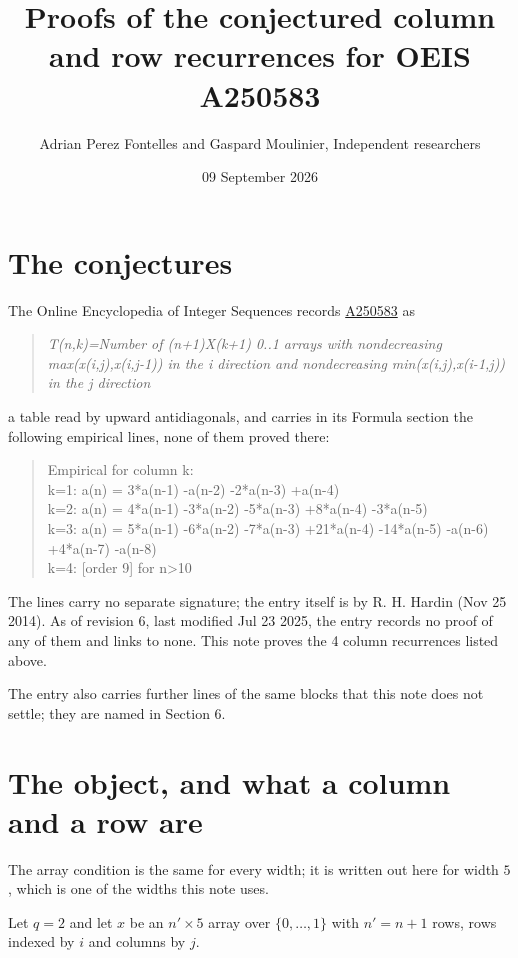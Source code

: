 \documentclass[11pt]{article}
\title{Proofs of the conjectured column and row recurrences for OEIS A250583}
\author{Adrian Perez Fontelles and Gaspard Moulinier, Independent researchers}
\date{09 September 2026}
\theoremstyle{definition}
\begin{document}
\maketitle
\section{The conjectures}

The Online Encyclopedia of Integer Sequences records \href{https://oeis.org/A250583}{A250583} as

\begin{quote}\itshape T(n,k)=Number of (n+1)X(k+1) 0..1 arrays with nondecreasing max(x(i,j),x(i,j-1)) in the i direction and nondecreasing min(x(i,j),x(i-1,j)) in the j direction\end{quote}

a table read by upward antidiagonals, and carries in its Formula section the following empirical lines, none of them proved there:

\begin{quote}\ttfamily Empirical for column k:\\
k=1: a(n) = 3*a(n-1) -a(n-2) -2*a(n-3) +a(n-4)\\k=2: a(n) = 4*a(n-1) -3*a(n-2) -5*a(n-3) +8*a(n-4) -3*a(n-5)\\k=3: a(n) = 5*a(n-1) -6*a(n-2) -7*a(n-3) +21*a(n-4) -14*a(n-5) -a(n-6) +4*a(n-7) -a(n-8)\\k=4: [order 9] for n>10\end{quote}

The lines carry no separate signature; the entry itself is by R. H. Hardin (Nov 25 2014). As of revision 6, last modified Jul 23 2025, the entry records no proof of any of them and links to none. This note proves the 4 column recurrences listed above.

The entry also carries further lines of the same blocks that this note does not settle; they are named in Section 6.

\section{The object, and what a column and a row are}

The array condition is the same for every width; it is written out here for width $5$, which is one of the widths this note uses.

Let $q = 2$ and let $x$ be an $n' \times 5$ array over $\{0,\dots,1\}$ with $n' = n + 1$ rows, rows indexed by $i$ and columns by $j$.
\end{document}
